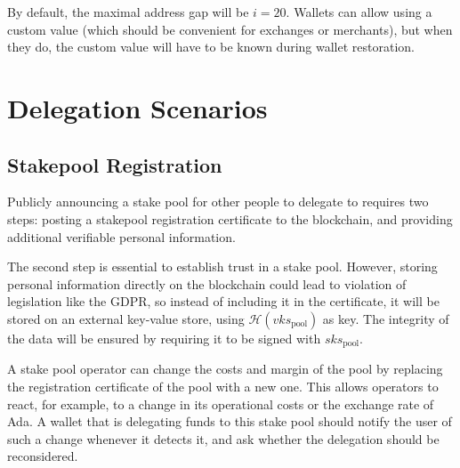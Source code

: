 \documentclass[11pt,a4paper]{article}
\begin{document}
By default, the maximal address gap will be \(i=20\). Wallets can
allow using a custom value (which should be convenient for exchanges
or merchants), but when they do, the custom value will have to be
known during wallet restoration.

\section{Delegation Scenarios}
\label{delegation-scenarios}

\subsection{Stakepool Registration}
\label{stakepool-registration}

Publicly announcing a stake pool for other people to delegate to
requires two steps: posting a stakepool registration certificate to the
blockchain, and providing additional verifiable personal information.

The second step is essential to establish trust in a stake pool.
However, storing personal information directly on the blockchain could
lead to violation of legislation like the GDPR, so instead of including
it in the certificate, it will be stored on an external key-value store,
using \(\mathcal{H}(vks_\text{pool})\) as key. The integrity of the data
will be ensured by requiring it to be signed with \(sks_\text{pool}\).

A stake pool operator can change the costs and margin of the pool by
replacing the registration certificate of the pool with a new
one. This allows operators to react, for example, to a change in its
operational costs or the exchange rate of Ada. A wallet that is
delegating funds to this stake pool should notify the user of such a
change whenever it detects it, and ask whether the delegation should
be reconsidered.
\end{document}
